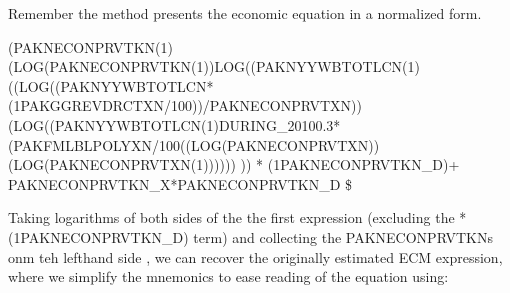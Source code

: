 \documentclass[letterpaper,10pt,english]{jupyterBook}
\begin{document}
\sphinxAtStartPar
Remember the  method presents the economic equation in a normalized form.

\sphinxAtStartPar
(PAKNECONPRVTKN(\sphinxhyphen{}1)(LOG(PAKNECONPRVTKN(\sphinxhyphen{}1))\sphinxhyphen{}LOG((PAKNYYWBTOTLCN(\sphinxhyphen{}1)((LOG((PAKNYYWBTOTLCN*(1\sphinxhyphen{}PAKGGREVDRCTXN/100))/PAKNECONPRVTXN))\sphinxhyphen{}(LOG((PAKNYYWBTOTLCN(\sphinxhyphen{}1)DURING\_2010\sphinxhyphen{}0.3*(PAKFMLBLPOLYXN/100\sphinxhyphen{}((LOG(PAKNECONPRVTXN))\sphinxhyphen{}(LOG(PAKNECONPRVTXN(\sphinxhyphen{}1)))))) )) * (1\sphinxhyphen{}PAKNECONPRVTKN\_D)+ PAKNECONPRVTKN\_X*PAKNECONPRVTKN\_D  \$

\sphinxAtStartPar
Taking logarithms of both sides of the the first expression (excluding the *(1\sphinxhyphen{}PAKNECONPRVTKN\_D) term) and collecting the PAKNECONPRVTKNs onm teh left\sphinxhyphen{}hand side , we can recover the originally estimated ECM expression, where we simplify the mnemonics to ease reading of the equation using:
\end{document}
